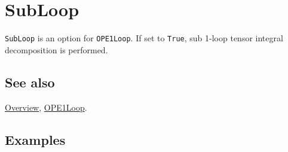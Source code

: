 \documentclass[../FeynCalcManual.tex]{subfiles}
\begin{document}
\hypertarget{subloop}{
\section{SubLoop}\label{subloop}}

\texttt{SubLoop} is an option for \texttt{OPE1Loop}. If set to
\texttt{True}, sub 1-loop tensor integral decomposition is performed.

\subsection{See also}

\hyperlink{toc}{Overview}, \hyperlink{ope1loop}{OPE1Loop}.

\subsection{Examples}
\end{document}
